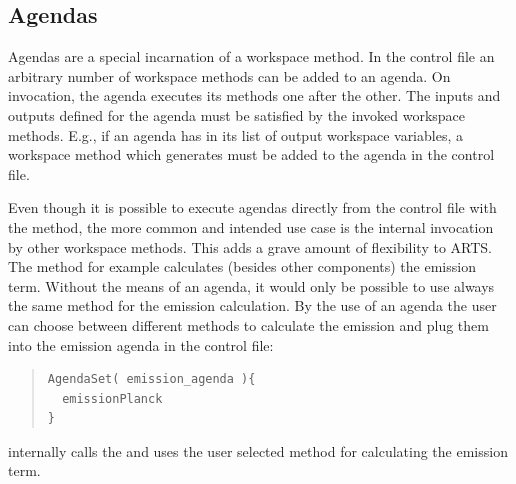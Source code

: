 \subsection{Agendas}

Agendas are a special incarnation of a workspace method. In the
control file an arbitrary number of workspace methods can be added to
an agenda. On invocation, the agenda executes its methods one
after the other. The inputs and outputs defined for the agenda must
be satisfied by the invoked workspace methods. E.g., if an agenda
has  in its list of output workspace variables, a
workspace method which generates  must be added to
the agenda in the control file.

Even though it is possible to execute agendas directly from the
control file with the  method, the more common
and intended use case is the internal invocation by other workspace
methods. This adds a grave amount of flexibility to ARTS. The
 method for example calculates (besides other
components) the emission term. Without the means of an agenda, it
would only be possible to use always the same method for the emission
calculation. By the use of an agenda the user can choose between
different methods to calculate the emission and plug them into the
emission agenda in the control file:

\begin{quote}
\begin{verbatim}
AgendaSet( emission_agenda ){
  emissionPlanck
}
\end{verbatim}
\end{quote}

\noindent
{} internally calls the  and
uses the user selected method for calculating the emission term.


